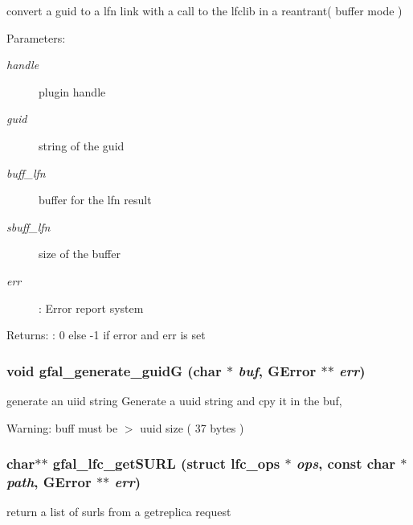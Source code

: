 convert a guid to a lfn link with a call to the lfclib in a reantrant( buffer mode ) \begin{Desc}
\item[Parameters:]
\begin{description}
\item[{\em handle}]plugin handle \item[{\em guid}]string of the guid \item[{\em buff\_\-lfn}]buffer for the lfn result \item[{\em sbuff\_\-lfn}]size of the buffer \item[{\em err}]: Error report system \end{description}
\end{Desc}
\begin{Desc}
\item[Returns:]: 0 else -1 if error and err is set \end{Desc}
\subsubsection{\setlength{\rightskip}{0pt plus 5cm}void gfal\_\-generate\_\-guid\-G (char $\ast$ {\em buf}, GError $\ast$$\ast$ {\em err})}\label{lfc__ifce__ng_8c_4cb5e50a1af5612463aaa525162a2e9e}


generate an uiid string Generate a uuid string and cpy it in the buf, 

\begin{Desc}
\item[Warning:]buff must be $>$ uuid size ( 37 bytes ) \end{Desc}
\subsubsection{\setlength{\rightskip}{0pt plus 5cm}char$\ast$$\ast$ gfal\_\-lfc\_\-get\-SURL (struct lfc\_\-ops $\ast$ {\em ops}, const char $\ast$ {\em path}, GError $\ast$$\ast$ {\em err})}\label{lfc__ifce__ng_8c_26c355c9cf576886a743ab1917de295d}


return a list of surls from a getreplica request 
